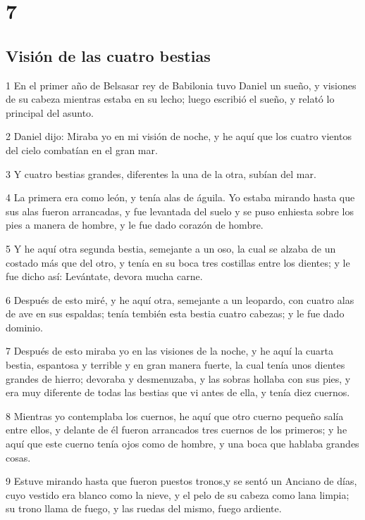 \chapter{7}

\section*{Visión de las cuatro bestias}

\par 1 En el primer año de Belsasar rey de Babilonia tuvo Daniel un sueño, y visiones de su cabeza mientras estaba en su lecho; luego escribió el sueño, y relató lo principal del asunto.
\par 2 Daniel dijo: Miraba yo en mi visión de noche, y he aquí que los cuatro vientos del cielo combatían en el gran mar.
\par 3 Y cuatro bestias grandes, diferentes la una de la otra, subían del mar. 
\par 4 La primera era como león, y tenía alas de águila. Yo estaba mirando hasta que sus alas fueron arrancadas, y fue levantada del suelo y se puso enhiesta sobre los pies a manera de hombre, y le fue dado corazón de hombre.
\par 5 Y he aquí otra segunda bestia, semejante a un oso, la cual se alzaba de un costado más que del otro, y tenía en su boca tres costillas entre los dientes; y le fue dicho así: Levántate, devora mucha carne.
\par 6 Después de esto miré, y he aquí otra, semejante a un leopardo, con cuatro alas de ave en sus espaldas; tenía tembién esta bestia cuatro cabezas; y le fue dado dominio. 
\par 7 Después de esto miraba yo en las visiones de la noche, y he aquí la cuarta bestia, espantosa y terrible y en gran manera fuerte, la cual tenía unos dientes grandes de hierro; devoraba y desmenuzaba, y las sobras hollaba con sus pies, y era muy diferente de todas las bestias que vi antes de ella, y tenía diez cuernos. 
\par 8 Mientras yo contemplaba los cuernos, he aquí que otro cuerno pequeño salía entre ellos, y delante de él fueron arrancados tres cuernos de los primeros; y he aquí que este cuerno tenía ojos como de hombre, y una boca que hablaba grandes cosas. 
\par 9 Estuve mirando hasta que fueron puestos tronos,y se sentó un Anciano de días, cuyo vestido era blanco como la nieve, y el pelo de su cabeza como lana limpia; su trono llama de fuego, y las ruedas del mismo, fuego ardiente.
